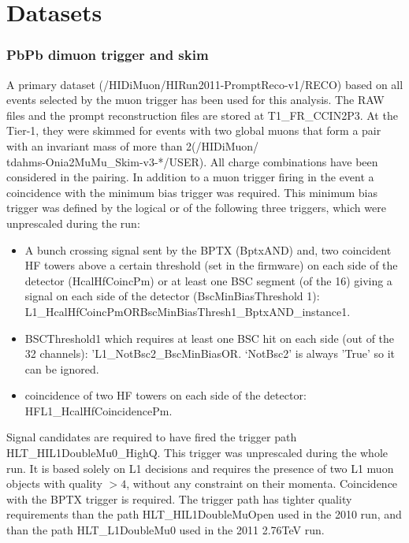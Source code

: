 \chapter{Datasets}
\subsection{PbPb dimuon trigger and skim}

A primary dataset (/HIDiMuon/HIRun2011-PromptReco-v1/RECO) based on
all events selected by the muon trigger has been used for this
analysis. The RAW files and the prompt reconstruction files are stored
at T1\_FR\_CCIN2P3. At the Tier-1, they were skimmed for events with
two global muons that form a pair with an invariant mass of more than
2\GeVcc (/HIDiMuon/\\tdahms-Onia2MuMu\_Skim-v3-*/USER). All charge
combinations have been considered in the pairing. In addition to a
muon trigger firing in the event a coincidence with the minimum bias
trigger was required. This minimum bias trigger was defined by the
logical or of the following three triggers, which were unprescaled during the run:
\begin{itemize}
\item A bunch crossing signal sent by the BPTX (BptxAND) and,  two coincident HF
towers above a certain threshold (set in the firmware) on each side of the detector (HcalHfCoincPm) or at least one BSC segment (of the 16) giving a signal on each side of the detector (BscMinBiasThreshold 1):\\
  L1\_HcalHfCoincPmORBscMinBiasThresh1\_BptxAND\_instance1.
\item BSCThreshold1 which requires at least one BSC hit on each side (out of the 32 channels): 'L1\_NotBsc2\_BscMinBiasOR. `NotBsc2' is always 'True' so it can be ignored.
\item coincidence of two HF towers on each side of the detector: HFL1\_HcalHfCoincidencePm.
\end{itemize}

Signal candidates are required to have fired the trigger path  {{HLT\_HIL1DoubleMu0\_HighQ}}. This trigger was unprescaled during the whole run. It is based solely on L1 decisions and requires the
presence of two L1 muon objects with quality $>4$, without any
constraint on their momenta. Coincidence with the BPTX trigger is required. 
The trigger path has tighter quality requirements than the path HLT\_HIL1DoubleMuOpen  
used in the 2010 \PbPb run, and than the path 
HLT\_L1DoubleMu0 used in the 2011 \pp 2.76TeV run. 

